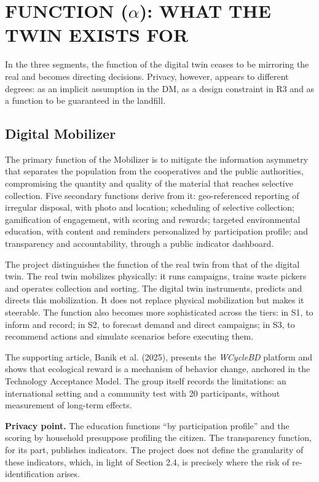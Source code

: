 \documentclass[12pt,a4paper,article,oneside,brazil,english]{abntex2}
\begin{document}
\section{FUNCTION (\texorpdfstring{$\alpha$}{alpha}): WHAT THE TWIN EXISTS FOR}

In the three segments, the function of the digital twin ceases to be mirroring the real and becomes directing decisions. Privacy, however, appears to different degrees: as an implicit assumption in the DM, as a design constraint in R3 and as a function to be guaranteed in the landfill.

\subsection{Digital Mobilizer}

The primary function of the Mobilizer is to mitigate the information asymmetry that separates the population from the cooperatives and the public authorities, compromising the quantity and quality of the material that reaches selective collection. Five secondary functions derive from it: geo-referenced reporting of irregular disposal, with photo and location; scheduling of selective collection; gamification of engagement, with scoring and rewards; targeted environmental education, with content and reminders personalized by participation profile; and transparency and accountability, through a public indicator dashboard.

The project distinguishes the function of the real twin from that of the digital twin. The real twin mobilizes physically: it runs campaigns, trains waste pickers and operates collection and sorting. The digital twin instruments, predicts and directs this mobilization. It does not replace physical mobilization but makes it steerable. The function also becomes more sophisticated across the tiers: in S1, to inform and record; in S2, to forecast demand and direct campaigns; in S3, to recommend actions and simulate scenarios before executing them.

The supporting article, Banik et al. (2025), presents the \textit{WCycleBD} platform and shows that ecological reward is a mechanism of behavior change, anchored in the Technology Acceptance Model. The group itself records the limitations: an international setting and a community test with 20 participants, without measurement of long-term effects.

\textbf{Privacy point.} The education functions ``by participation profile'' and the scoring by household presuppose profiling the citizen. The transparency function, for its part, publishes indicators. The project does not define the granularity of these indicators, which, in light of Section 2.4, is precisely where the risk of re-identification arises.
\end{document}
